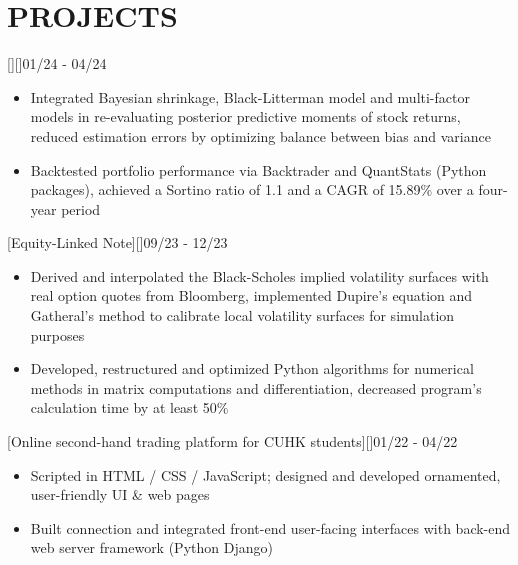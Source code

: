 \documentclass[cmu]{resume}
\begin{document}
    \section{PROJECTS}
    [][]{01/24 - 04/24}
    \begin{itemize}
        \item Integrated Bayesian shrinkage, Black-Litterman model and multi-factor models in re-evaluating posterior predictive moments of stock returns, reduced estimation errors by optimizing balance between bias and variance
        \item Backtested portfolio performance via Backtrader and QuantStats (Python packages), achieved a Sortino ratio of 1.1 and a CAGR of 15.89\% over a four-year period
    \end{itemize}

    [Equity-Linked Note][]{09/23 - 12/23}
    \begin{itemize}
        \item Derived and interpolated the Black-Scholes implied volatility surfaces with real option quotes from Bloomberg, implemented Dupire's equation and Gatheral's method to calibrate local volatility surfaces for simulation purposes
        \item Developed, restructured and optimized Python algorithms for numerical methods in matrix computations and differentiation, decreased program's calculation time by at least 50\%
    \end{itemize}


    [Online second-hand trading platform for CUHK students][]{01/22 - 04/22}
    \begin{itemize}
        \item Scripted in HTML / CSS / JavaScript; designed and developed ornamented, user-friendly UI \& web pages
        \item Built connection and integrated front-end user-facing interfaces with back-end web server framework (Python Django)
    \end{itemize}
\end{document}
